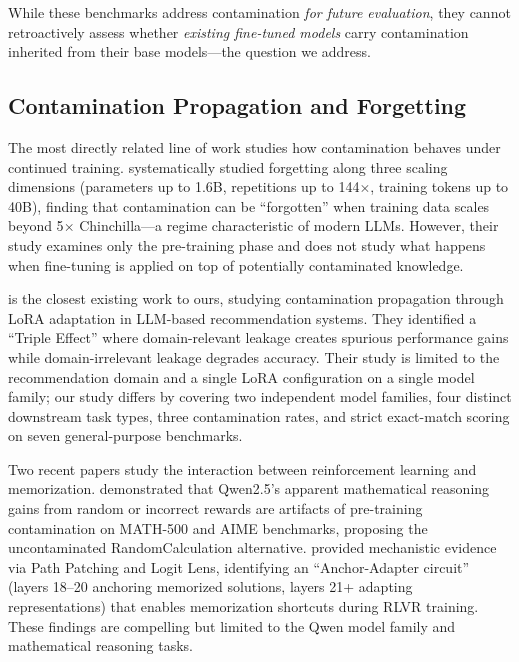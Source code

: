 While these benchmarks address contamination \emph{for future evaluation}, they cannot retroactively assess whether \emph{existing fine-tuned models} carry contamination inherited from their base models---the question we address.

\subsection{Contamination Propagation and Forgetting}

The most directly related line of work studies how contamination behaves under continued training. \citet{bordt2025forgetting} systematically studied forgetting along three scaling dimensions (parameters up to 1.6B, repetitions up to 144$\times$, training tokens up to 40B), finding that contamination can be ``forgotten'' when training data scales beyond 5$\times$ Chinchilla---a regime characteristic of modern LLMs. However, their study examines only the pre-training phase and does not study what happens when fine-tuning is applied on top of potentially contaminated knowledge.

\citet{zhang2026leakagetrap} is the closest existing work to ours, studying contamination propagation through LoRA adaptation in LLM-based recommendation systems. They identified a ``Triple Effect'' where domain-relevant leakage creates spurious performance gains while domain-irrelevant leakage degrades accuracy. Their study is limited to the recommendation domain and a single LoRA configuration on a single model family; our study differs by covering two independent model families, four distinct downstream task types, three contamination rates, and strict exact-match scoring on seven general-purpose benchmarks.

Two recent papers study the interaction between reinforcement learning and memorization. \citet{wu2025reasoning} demonstrated that Qwen2.5's apparent mathematical reasoning gains from random or incorrect rewards are artifacts of pre-training contamination on MATH-500 and AIME benchmarks, proposing the uncontaminated RandomCalculation alternative. \citet{yan2026spurious} provided mechanistic evidence via Path Patching and Logit Lens, identifying an ``Anchor-Adapter circuit'' (layers 18--20 anchoring memorized solutions, layers 21+ adapting representations) that enables memorization shortcuts during RLVR training. These findings are compelling but limited to the Qwen model family and mathematical reasoning tasks.

